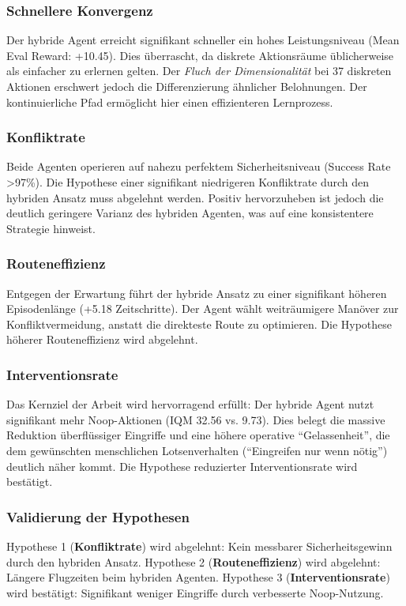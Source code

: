 \subsubsection*{Schnellere Konvergenz}
Der hybride Agent erreicht signifikant schneller ein hohes Leistungsniveau (Mean Eval Reward: +10.45). Dies überrascht, da diskrete Aktionsräume üblicherweise als einfacher zu erlernen gelten. Der \textit{Fluch der Dimensionalität} bei 37 diskreten Aktionen erschwert jedoch die Differenzierung ähnlicher Belohnungen. Der kontinuierliche Pfad ermöglicht hier einen effizienteren Lernprozess.

\subsubsection*{Konfliktrate}
Beide Agenten operieren auf nahezu perfektem Sicherheitsniveau (Success Rate >97\%). Die Hypothese einer signifikant niedrigeren Konfliktrate durch den hybriden Ansatz muss abgelehnt werden. Positiv hervorzuheben ist jedoch die deutlich geringere Varianz des hybriden Agenten, was auf eine konsistentere Strategie hinweist.

\subsubsection*{Routeneffizienz}
Entgegen der Erwartung führt der hybride Ansatz zu einer signifikant höheren Episodenlänge (+5.18 Zeitschritte). Der Agent wählt weiträumigere Manöver zur Konfliktvermeidung, anstatt die direkteste Route zu optimieren. Die Hypothese höherer Routeneffizienz wird abgelehnt.

\subsubsection*{Interventionsrate}
Das Kernziel der Arbeit wird hervorragend erfüllt: Der hybride Agent nutzt signifikant mehr Noop-Aktionen (\ac{IQM} 32.56 vs. 9.73). Dies belegt die massive Reduktion überflüssiger Eingriffe und eine höhere operative \enquote{Gelassenheit}, die dem gewünschten menschlichen Lotsenverhalten (\enquote{Eingreifen nur wenn nötig}) deutlich näher kommt. Die Hypothese reduzierter Interventionsrate wird bestätigt.

\subsubsection*{Validierung der Hypothesen}
Hypothese 1 (\textbf{Kon\-flikt\-rate}) wird abgelehnt: Kein messbarer Sicherheitsgewinn durch den hybriden Ansatz. Hypothese 2 (\textbf{Rou\-ten\-effi\-zienz}) wird abgelehnt: Längere Flugzeiten beim hybriden Agenten. Hypothese 3 (\textbf{In\-ter\-ven\-tions\-rate}) wird bestätigt: Signifikant weniger Eingriffe durch verbesserte Noop-Nutzung.

